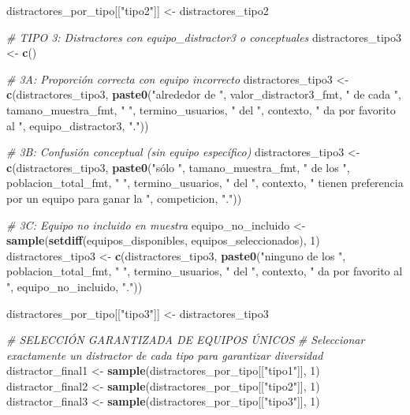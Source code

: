 \documentclass[
]{article}
\newenvironment{Shaded}{\begin{snugshade}}{\end{snugshade}}
\newcommand{\CommentTok}[1]{\textcolor[rgb]{0.56,0.35,0.01}{\textit{#1}}}
\newcommand{\DecValTok}[1]{\textcolor[rgb]{0.00,0.00,0.81}{#1}}
\newcommand{\FunctionTok}[1]{\textcolor[rgb]{0.13,0.29,0.53}{\textbf{#1}}}
\newcommand{\NormalTok}[1]{#1}
\newcommand{\OtherTok}[1]{\textcolor[rgb]{0.56,0.35,0.01}{#1}}
\newcommand{\StringTok}[1]{\textcolor[rgb]{0.31,0.60,0.02}{#1}}
\begin{document}
\begin{Shaded}
\begin{Highlighting}[]
\NormalTok{distractores\_por\_tipo[[}\StringTok{"tipo2"}\NormalTok{]] }\OtherTok{\textless{}{-}}\NormalTok{ distractores\_tipo2}

\CommentTok{\# TIPO 3: Distractores con equipo\_distractor3 o conceptuales}
\NormalTok{distractores\_tipo3 }\OtherTok{\textless{}{-}} \FunctionTok{c}\NormalTok{()}

\CommentTok{\# 3A: Proporción correcta con equipo incorrecto}
\NormalTok{distractores\_tipo3 }\OtherTok{\textless{}{-}} \FunctionTok{c}\NormalTok{(distractores\_tipo3,}
  \FunctionTok{paste0}\NormalTok{(}\StringTok{"alrededor de "}\NormalTok{, valor\_distractor3\_fmt, }\StringTok{" de cada "}\NormalTok{, tamano\_muestra\_fmt, }\StringTok{" "}\NormalTok{,}
\NormalTok{         termino\_usuarios, }\StringTok{" del "}\NormalTok{, contexto, }\StringTok{" da por favorito al "}\NormalTok{, equipo\_distractor3, }\StringTok{"."}\NormalTok{))}

\CommentTok{\# 3B: Confusión conceptual (sin equipo específico)}
\NormalTok{distractores\_tipo3 }\OtherTok{\textless{}{-}} \FunctionTok{c}\NormalTok{(distractores\_tipo3,}
  \FunctionTok{paste0}\NormalTok{(}\StringTok{"sólo "}\NormalTok{, tamano\_muestra\_fmt, }\StringTok{" de los "}\NormalTok{, poblacion\_total\_fmt, }\StringTok{" "}\NormalTok{,}
\NormalTok{         termino\_usuarios, }\StringTok{" del "}\NormalTok{, contexto,}
         \StringTok{" tienen preferencia por un equipo para ganar la "}\NormalTok{, competicion, }\StringTok{"."}\NormalTok{))}

\CommentTok{\# 3C: Equipo no incluido en muestra}
\NormalTok{equipo\_no\_incluido }\OtherTok{\textless{}{-}} \FunctionTok{sample}\NormalTok{(}\FunctionTok{setdiff}\NormalTok{(equipos\_disponibles, equipos\_seleccionados), }\DecValTok{1}\NormalTok{)}
\NormalTok{distractores\_tipo3 }\OtherTok{\textless{}{-}} \FunctionTok{c}\NormalTok{(distractores\_tipo3,}
  \FunctionTok{paste0}\NormalTok{(}\StringTok{"ninguno de los "}\NormalTok{, poblacion\_total\_fmt, }\StringTok{" "}\NormalTok{, termino\_usuarios,}
         \StringTok{" del "}\NormalTok{, contexto, }\StringTok{" da por favorito al "}\NormalTok{, equipo\_no\_incluido, }\StringTok{"."}\NormalTok{))}

\NormalTok{distractores\_por\_tipo[[}\StringTok{"tipo3"}\NormalTok{]] }\OtherTok{\textless{}{-}}\NormalTok{ distractores\_tipo3}

\CommentTok{\# SELECCIÓN GARANTIZADA DE EQUIPOS ÚNICOS}
\CommentTok{\# Seleccionar exactamente un distractor de cada tipo para garantizar diversidad}
\NormalTok{distractor\_final1 }\OtherTok{\textless{}{-}} \FunctionTok{sample}\NormalTok{(distractores\_por\_tipo[[}\StringTok{"tipo1"}\NormalTok{]], }\DecValTok{1}\NormalTok{)}
\NormalTok{distractor\_final2 }\OtherTok{\textless{}{-}} \FunctionTok{sample}\NormalTok{(distractores\_por\_tipo[[}\StringTok{"tipo2"}\NormalTok{]], }\DecValTok{1}\NormalTok{)}
\NormalTok{distractor\_final3 }\OtherTok{\textless{}{-}} \FunctionTok{sample}\NormalTok{(distractores\_por\_tipo[[}\StringTok{"tipo3"}\NormalTok{]], }\DecValTok{1}\NormalTok{)}


\end{Highlighting}
\end{Shaded}
\end{document}
